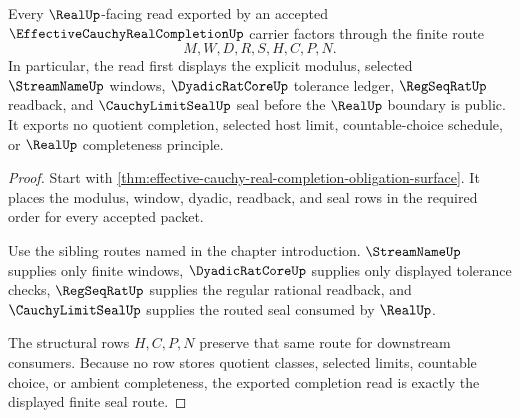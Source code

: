 \begin{theorem}
\label{thm:effective-cauchy-real-completion-seal-route}
Every $\RealUp$-facing read exported by an accepted $\EffectiveCauchyRealCompletionUp$ carrier factors through the finite route
$$
M,W,D,R,S,H,C,P,N .
$$
In particular, the read first displays the explicit modulus, selected $\StreamNameUp$ windows, $\DyadicRatCoreUp$ tolerance ledger, $\RegSeqRatUp$ readback, and $\CauchyLimitSealUp$ seal before the $\RealUp$ boundary is public. It exports no quotient completion, selected host limit, countable-choice schedule, or $\RealUp$ completeness principle.
\end{theorem}
\begin{proof}
Start with \autoref{thm:effective-cauchy-real-completion-obligation-surface}. It places the modulus, window, dyadic, readback, and seal rows in the required order for every accepted packet.

Use the sibling routes named in the chapter introduction. $\StreamNameUp$ supplies only finite windows, $\DyadicRatCoreUp$ supplies only displayed tolerance checks, $\RegSeqRatUp$ supplies the regular rational readback, and $\CauchyLimitSealUp$ supplies the routed seal consumed by $\RealUp$.

The structural rows $H,C,P,N$ preserve that same route for downstream consumers. Because no row stores quotient classes, selected limits, countable choice, or ambient completeness, the exported completion read is exactly the displayed finite seal route.
\end{proof}


\begin{closurestatus}{\EffectiveCauchyRealCompletionUp}
  \theoryclosure{\seedClosure}
  \formalstatus{\formalTargetV}
\end{closurestatus}
